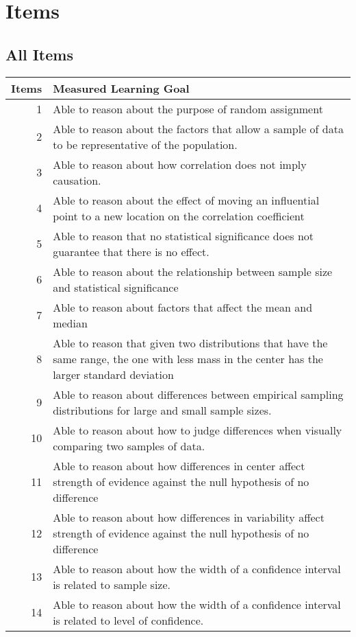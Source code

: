 \documentclass[11pt]{article}
\begin{document}
\section{Items}
\label{sec-3}

\subsection{All Items}
\label{sec-3-1}
\begin{center}
\begin{tabular}{rl}
\textbf{Items} & \textbf{Measured Learning Goal}\\
\hline
1 & Able to reason about the purpose of random assignment\\
2 & Able to reason about the factors that allow a sample of data to be representative of the population.\\
3 & Able to reason about how correlation does not imply causation.\\
4 & Able to reason about the effect of  moving an influential point to a new location on the correlation coefficient\\
5 & Able to reason that no statistical significance does not guarantee that there is no effect.\\
6 & Able to reason about the relationship between sample size and statistical significance\\
7 & Able to reason about factors that affect the mean and median\\
8 & Able to reason that given two distributions that have the same range, the one with less mass in the center has the larger standard deviation\\
9 & Able to reason about differences between empirical sampling distributions for large and small sample sizes.\\
10 & Able to reason about how to judge differences when visually comparing two samples of data.\\
11 & Able to reason about how differences in center affect strength of evidence against the null hypothesis of no difference\\
12 & Able to reason about how differences in variability affect strength of evidence against the null hypothesis of no difference\\
13 & Able to reason about how the width of a confidence interval is related to sample size.\\
14 & Able to reason about how the width of a confidence interval is related to level of confidence.\\

\end{tabular}
\end{center}
\end{document}
